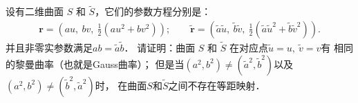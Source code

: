 \begin{example}\label{chhss:exam_NOiso}
    设有二维曲面 $S$ 和 $\tilde{S}$，它们的参数方程分别是：
    \begin{align*}
        \boldsymbol{r}=\left(a u,\  b v,\   \frac{1}{2}\left(a u^2+b v^2\right)\right); \qquad
        \boldsymbol{\tilde{r}}=\left(\tilde{a} \tilde{u},\   \tilde{b} \tilde{v},\   
        \frac{1}{2}\left(\tilde{a} \tilde{u}^2+\tilde{b} \tilde{v}^2\right)\right) .
    \end{align*}
    并且非零实参数满足$a b=\tilde{a} \tilde{b}$．
    请证明：曲面 $S$ 和 $\tilde{S}$ 在对应点$\tilde{u}=u,\ \tilde{v}=v$有
    相同的黎曼曲率（也就是Gauss曲率）；
    但是当$(a^2, b^2) \neq (\tilde{a}^2, \tilde{b}^2)$以及
    $(a^2, b^2) \neq(\tilde{b}^2, \tilde{a}^2)$时，
    在曲面$S$和$\tilde{S}$之间不存在等距映射．    
\end{example}
